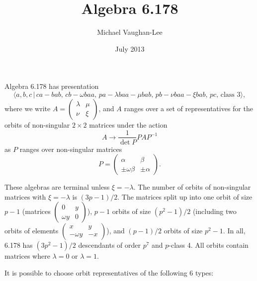 \documentclass[12pt]{article}
\begin{document}
\title{Algebra 6.178}
\author{Michael Vaughan-Lee}
\date{July 2013}
\maketitle

Algebra 6.178 has presentation 
\[
\langle a,b,c\,|\,ca-bab,\,cb-\omega baa,\,pa-\lambda baa-\mu bab,\,pb-\nu
baa-\xi bab,\,pc,\,\text{class }3\rangle , 
\]%
where we write $A=\left( 
\begin{array}{ll}
\lambda & \mu \\ 
\nu & \xi%
\end{array}%
\right) $, and $A$ ranges over a set of representatives for the orbits of
non-singular $2\times 2$ matrices under the action 
\[
A\rightarrow \frac{1}{\det P}PAP^{-1} 
\]%
as $P$ ranges over non-singular matrices 
\[
P=\left( 
\begin{array}{ll}
\alpha & \beta \\ 
\pm \omega \beta & \pm \alpha%
\end{array}%
\right) . 
\]%
$\allowbreak $

These algebras are terminal unless $\xi =-\lambda $. The number of orbits of
non-singular matrices with $\xi =-\lambda $ is $(3p-1)/2$. The matrices
split up into one orbit of size $p-1$ (matrices $\left( 
\begin{array}{ll}
0 & y \\ 
\omega y & 0%
\end{array}%
\right) $), $p-1$ orbits of size $(p^{2}-1)/2$ (including two orbits of
elements $\left( 
\begin{array}{ll}
x & y \\ 
-\omega y & -x%
\end{array}%
\right) $), and $(p-1)/2$ orbits of size $p^{2}-1$. In all, 6.178 has $%
(3p^{2}-1)/2$ descendants of order $p^{7}$ and $p$-class 4. All orbits
contain matrices where $\lambda =0$ or $\lambda =1$.

It is possible to choose orbit representatives of the following 6 types: 
\end{document}
